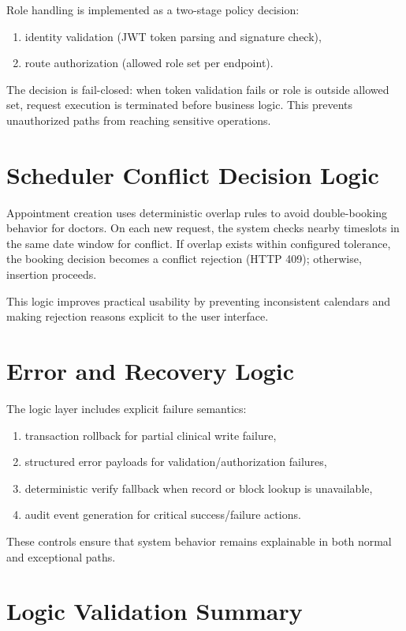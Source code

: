 \documentclass[12pt,a4paper]{report}
\begin{document}
Role handling is implemented as a two-stage policy decision:

\begin{enumerate}
\item identity validation (JWT token parsing and signature check),
\item route authorization (allowed role set per endpoint).
\end{enumerate}

The decision is fail-closed: when token validation fails or role is outside allowed set, request execution is terminated before business logic. This prevents unauthorized paths from reaching sensitive operations.

\section{Scheduler Conflict Decision Logic}

Appointment creation uses deterministic overlap rules to avoid double-booking behavior for doctors. On each new request, the system checks nearby timeslots in the same date window for conflict. If overlap exists within configured tolerance, the booking decision becomes a conflict rejection (HTTP 409); otherwise, insertion proceeds.

This logic improves practical usability by preventing inconsistent calendars and making rejection reasons explicit to the user interface.

\section{Error and Recovery Logic}

The logic layer includes explicit failure semantics:

\begin{enumerate}
\item transaction rollback for partial clinical write failure,
\item structured error payloads for validation/authorization failures,
\item deterministic verify fallback when record or block lookup is unavailable,
\item audit event generation for critical success/failure actions.
\end{enumerate}

These controls ensure that system behavior remains explainable in both normal and exceptional paths.

\section{Logic Validation Summary}
\end{document}
